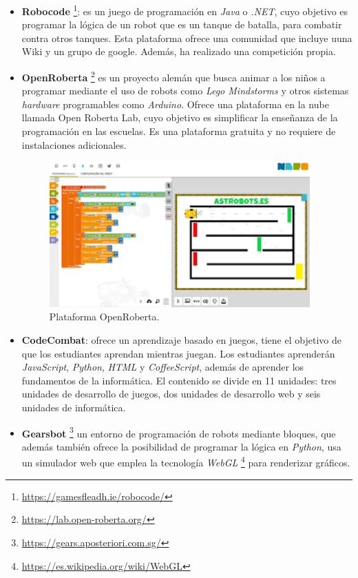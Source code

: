 \documentclass[a4paper, 12pt]{book}
\begin{document}
\begin{itemize}
\item \textbf{Robocode} \footnote{\url{https://gamesfleadh.ie/robocode/}}: es un juego de programación en \emph{Java} o \emph{.NET}, cuyo objetivo es programar la lógica de un robot que es un tanque de batalla, para combatir contra otros tanques. Esta plataforma ofrece una comunidad que incluye uuna Wiki y un grupo de google. Además, ha realizado una competición propia.
\item \textbf{OpenRoberta} \footnote{\url{https://lab.open-roberta.org/}} es un proyecto alemán que busca animar a los niños a programar mediante el uso de robots como \emph{Lego Mindstorms} y otros sistemas \emph{hardware} programables como \emph{Arduino}. Ofrece una plataforma en la nube llamada Open Roberta Lab, cuyo objetivo es simplificar la enseñanza de la programación en las escuelas. Es una plataforma gratuita y no requiere de instalaciones adicionales.

\begin{figure}[H]
	\centering
    \includegraphics[width=10cm]{img/roberta.png}
    \caption{Plataforma OpenRoberta.}
\end{figure}

\item \textbf{CodeCombat}: ofrece un aprendizaje basado en juegos, tiene el objetivo de que los estudiantes aprendan mientras juegan. Los estudiantes aprenderán \emph{JavaScript}, \emph{Python}, \emph{HTML} y \emph{CoffeeScript}, además de aprender los fundamentos de la informática. El contenido se divide en 11 unidades: tres unidades de desarrollo de juegos, dos unidades de desarrollo web y seis unidades de informática.
\item \textbf{Gearsbot} \footnote{\url{https://gears.aposteriori.com.sg/}} un entorno de programación de robots mediante bloques, que además también ofrece la posibilidad de programar la lógica en \emph{Python}, usa un simulador web que emplea la tecnología \emph{WebGL} \footnote{\url{https://es.wikipedia.org/wiki/WebGL}} para renderizar gráficos.
\end{itemize}
\end{document}
